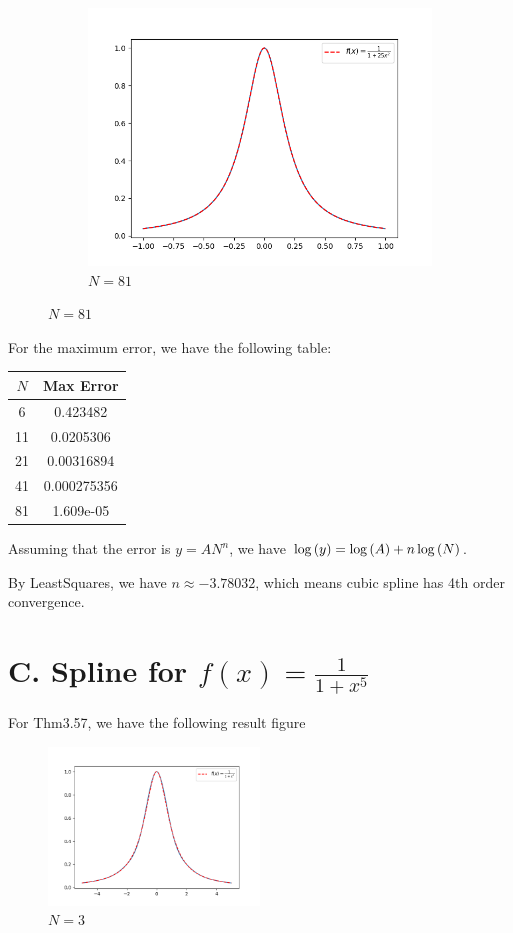 \documentclass[a4paper]{article}
\begin{document}
\begin{figure}[H]
\begin{subfigure}[b]{0.4\textwidth}
        \includegraphics[width=\textwidth]{../figure/A_81.png}
        \caption{$N=81$}
    \end{subfigure}
\end{figure}

For the maximum error, we have the following table:
\begin{table}[H]
    \centering
    \begin{tabular}{|c|c|}
        \hline
        $N$ & Max Error \\
        \hline
        6 & 0.423482 \\
        11 & 0.0205306 \\
        21 & 0.00316894 \\
        41 & 0.000275356 \\
        81 & 1.609e-05 \\
        \hline
    \end{tabular}
\end{table}

Assuming that the error is $y = A N^n$, we have $\log\qty(y) = \log\qty(A) + n \log\qty(N)$. 

By LeastSquares, we have $n \approx -3.78032$, which means cubic spline has 4th order convergence.

\section{C. Spline for $f(x) = \frac{1}{1 + x^5}$}

For Thm3.57, we have the following result figure
\begin{figure}[H]
    \centering
    \includegraphics[width=0.5\textwidth]{../figure/C_3.png}
    \caption{$N=3$}
\end{figure}
\end{document}
